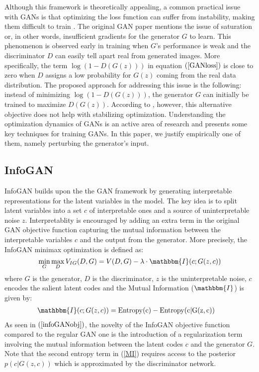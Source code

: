 \documentclass{article}
\newcommand{\I}{\mathbbm{I}}
\begin{document}
Although this framework is theoretically appealing, a common practical issue with GANs is that optimizing the loss function can suffer from instability, making them difficult to train \cite{Goodfellow-et-al-2016-Book}. The original GAN paper \cite{goodfellow2014generative} mentions the issue of saturation or, in other words,  insufficient gradients for the generator $G$ to learn. This phenomenon is observed early in training when $G$'s performance is weak and the discriminator $D$ can easily tell apart real from generated images. More specifically, the term $\log(1-D(G(z)))$ in equation $(\ref{GANloss})$ is close to zero when $D$ assigns a low probability for $G(z)$ coming from the real data distribution. The proposed approach for addressing this issue is the following: instead of minimizing $\log(1-D(G(z)))$, the generator $G$ can initially be trained to maximize $D(G(z))$. According to \cite{howtotrainagan2016}, however, this alternative objective does not help with stabilizing optimization. Understanding the optimization dynamics of GANs is an active area of research and \cite{howtotrainagan2016} presents some key techniques for training GANs. In this paper, we justify empirically one of them, namely perturbing the generator's input. 

\subsection{InfoGAN}
InfoGAN \cite{chen2016infogan} builds upon the the GAN framework by generating interpretable representations for the latent variables in the model. The key idea is to split latent variables into a set $c$ of interpretable ones and a source of uninterpretable noise $z$. Interpretablity is encouraged by adding an extra term in the original GAN objective function capturing the mutual information between the interpretable variables $c$ and the output from the generator. More precisely, the InfoGAN minimax optimization is defined as:
\begin{equation}
\label{infoGANobj}\min_G\max_D V_{IG} (D,G) = V(D,G) - \lambda\cdot\I (c;G(z,c))    
\end{equation}
where $G$ is the generator, $D$ is the discriminator, $z$ is the uninterpretable noise, $c$ encodes the salient latent codes and the Mutual Information ($\I$) is given by:
\begin{align}\label{MI}
\I(c; G(z,c) ) & = \rm{Entropy}(c) - \rm{Entropy}(c|G(z,c))
\end{align}
As seen in $(\ref{infoGANobj})$, the novelty of the InfoGAN objective function compared to the regular GAN one is the introduction of a regularization term involving the mutual information between the latent codes $c$ and the generator $G$. Note that the second entropy term in (\ref{MI}) requires access to the posterior $p(c| G(z,c))$ which is approximated by the discriminator network. 
\end{document}
